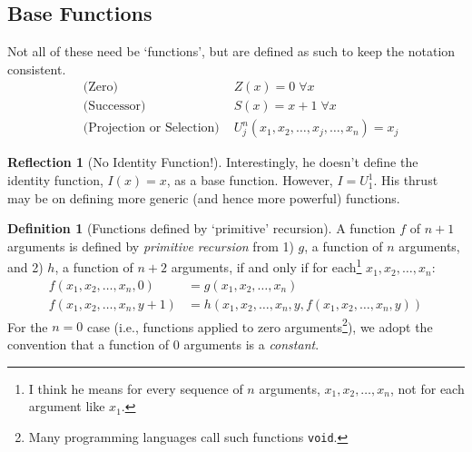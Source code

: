 \documentclass[11pt]{book}
\theoremstyle{definition}
\newtheorem{definition}{Definition}
\theoremstyle{plain}
\theoremstyle{problemstyle}
\theoremstyle{remark}
\theoremstyle{definition}
\newtheorem{reflection}{Reflection}
\begin{document}
\subsection*{Base Functions}
Not all of these need be `functions', but are defined as such to keep the notation consistent.
\begin{equation}
    \label{eq:base-functions}
    \begin{aligned}
        &\text{(Zero) }&Z(x)=0\;\forall x\\
        &\text{(Successor) }&S(x)=x+1\;\forall x\\
        &\text{(Projection or Selection) }&U^n_j(x_1,x_2,\dots,x_j,\dots,x_n)=x_j
    \end{aligned}
\end{equation}
\begin{reflection}[No Identity Function!]
    Interestingly, he doesn't define the identity function, $I(x)=x$, as a base function. However, $I=U_1^1$. His thrust may be on defining more generic (and hence more powerful) functions.
\end{reflection}
\begin{definition}[Functions defined by `primitive' recursion]
    \label{def:primitive-recursion}
    A function $f$ of $n+1$ arguments is defined by \emph{primitive recursion} from 1) $g$, a function of $n$ arguments, and 2) $h$, a function of $n+2$ arguments, if and only if for each\footnote{I think he means for every sequence of $n$ arguments, $x_1, x_2,\dots,x_n$, not for each argument like $x_1$.} $x_1,x_2,\dots,x_n$: 
    \begin{equation}
        \label{eq:primitive-recursion}
        \begin{aligned}
            f(x_1,x_2,\dots,x_n,0)&=g(x_1,x_2,\dots,x_n)\\
            f(x_1,x_2,\dots,x_n,y+1)&=h(x_1,x_2,\dots,x_n,y,f(x_1,x_2,\dots,x_n, y))
        \end{aligned}
    \end{equation}
    For the $n=0$ case (i.e., functions applied to zero arguments\footnote{Many programming languages call such functions \texttt{void}.}), we adopt the convention that a function of $0$ arguments is a \emph{constant}.
\end{definition}

\end{document}
